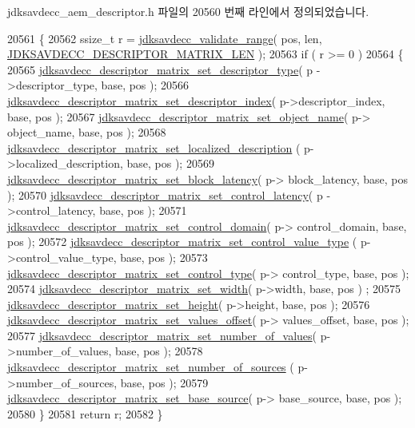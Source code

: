 jdksavdecc\+\_\+aem\+\_\+descriptor.\+h 파일의 20560 번째 라인에서 정의되었습니다.


\begin{DoxyCode}
20561 \{
20562     ssize\_t r = \hyperlink{group__util_ga9c02bdfe76c69163647c3196db7a73a1}{jdksavdecc\_validate\_range}( pos, len, 
      \hyperlink{group__descriptor__matrix_ga28ec282c7b2cb6dc955976b0727a616e}{JDKSAVDECC\_DESCRIPTOR\_MATRIX\_LEN} );
20563     \textcolor{keywordflow}{if} ( r >= 0 )
20564     \{
20565         \hyperlink{group__descriptor__matrix_gac1f9609b846df5762655a5958e7c7c23}{jdksavdecc\_descriptor\_matrix\_set\_descriptor\_type}( p
      ->descriptor\_type, base, pos );
20566         \hyperlink{group__descriptor__matrix_gaff8d6709530beca8aa5e9338104b0b49}{jdksavdecc\_descriptor\_matrix\_set\_descriptor\_index}(
       p->descriptor\_index, base, pos );
20567         \hyperlink{group__descriptor__matrix_gac8f597cc44cf27f4fd60ea008258112f}{jdksavdecc\_descriptor\_matrix\_set\_object\_name}( p->
      object\_name, base, pos );
20568         \hyperlink{group__descriptor__matrix_ga523f678806a8d03276e5a5fbff3bf5c8}{jdksavdecc\_descriptor\_matrix\_set\_localized\_description}
      ( p->localized\_description, base, pos );
20569         \hyperlink{group__descriptor__matrix_gaf5dc6d481666fb9d9638ca40997ac6da}{jdksavdecc\_descriptor\_matrix\_set\_block\_latency}( p->
      block\_latency, base, pos );
20570         \hyperlink{group__descriptor__matrix_gad5b25672a60689e53bccb0a6f4973b8e}{jdksavdecc\_descriptor\_matrix\_set\_control\_latency}( p
      ->control\_latency, base, pos );
20571         \hyperlink{group__descriptor__matrix_gad09ea750e42c18964924f3fb89ef66a0}{jdksavdecc\_descriptor\_matrix\_set\_control\_domain}( p->
      control\_domain, base, pos );
20572         \hyperlink{group__descriptor__matrix_gaa4411e574c75890fe990f161a2477e7b}{jdksavdecc\_descriptor\_matrix\_set\_control\_value\_type}
      ( p->control\_value\_type, base, pos );
20573         \hyperlink{group__descriptor__matrix_ga8fb0f46cb40a74d2505a59919cfb5834}{jdksavdecc\_descriptor\_matrix\_set\_control\_type}( p->
      control\_type, base, pos );
20574         \hyperlink{group__descriptor__matrix_ga468599c96bd0f95821546b4a019be251}{jdksavdecc\_descriptor\_matrix\_set\_width}( p->width, base, pos )
      ;
20575         \hyperlink{group__descriptor__matrix_ga5c4601f81e347dd3e1eed3d0346a4ca7}{jdksavdecc\_descriptor\_matrix\_set\_height}( p->height, base, 
      pos );
20576         \hyperlink{group__descriptor__matrix_ga8b0e73869a2608ac9f11747e666515b0}{jdksavdecc\_descriptor\_matrix\_set\_values\_offset}( p->
      values\_offset, base, pos );
20577         \hyperlink{group__descriptor__matrix_ga705fadd305ee372a565673f72a74804b}{jdksavdecc\_descriptor\_matrix\_set\_number\_of\_values}(
       p->number\_of\_values, base, pos );
20578         \hyperlink{group__descriptor__matrix_ga5807db32c5c9af7038755f97d5e6a14d}{jdksavdecc\_descriptor\_matrix\_set\_number\_of\_sources}
      ( p->number\_of\_sources, base, pos );
20579         \hyperlink{group__descriptor__matrix_gaa9d80d41ea9e5452a7150e77ba16a448}{jdksavdecc\_descriptor\_matrix\_set\_base\_source}( p->
      base\_source, base, pos );
20580     \}
20581     \textcolor{keywordflow}{return} r;
20582 \}
\end{DoxyCode}


